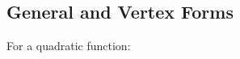 \documentclass{article}
\begin{document}





\subsection*{General and Vertex Forms}

For a quadratic function: \newline 
\end{document}
